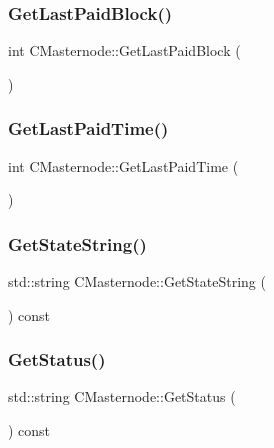 \subsubsection{\texorpdfstring{Get\+Last\+Paid\+Block()}{GetLastPaidBlock()}}
{\footnotesize\ttfamily int C\+Masternode\+::\+Get\+Last\+Paid\+Block (\begin{DoxyParamCaption}{ }\end{DoxyParamCaption})\hspace{0.3cm}{\ttfamily [inline]}}

\mbox{\label{class_c_masternode_a422620894cf5f9acfac5f44db526cc0d}} 
\subsubsection{\texorpdfstring{Get\+Last\+Paid\+Time()}{GetLastPaidTime()}}
{\footnotesize\ttfamily int C\+Masternode\+::\+Get\+Last\+Paid\+Time (\begin{DoxyParamCaption}{ }\end{DoxyParamCaption})\hspace{0.3cm}{\ttfamily [inline]}}

\mbox{\label{class_c_masternode_a24785b00a72b9c3c43e21bf2ef84b456}} 
\subsubsection{\texorpdfstring{Get\+State\+String()}{GetStateString()}}
{\footnotesize\ttfamily std\+::string C\+Masternode\+::\+Get\+State\+String (\begin{DoxyParamCaption}{ }\end{DoxyParamCaption}) const}

\mbox{\label{class_c_masternode_ac9983ac170cb085c6f826e5fcd9a9a5b}} 
\subsubsection{\texorpdfstring{Get\+Status()}{GetStatus()}}
{\footnotesize\ttfamily std\+::string C\+Masternode\+::\+Get\+Status (\begin{DoxyParamCaption}{ }\end{DoxyParamCaption}) const}

